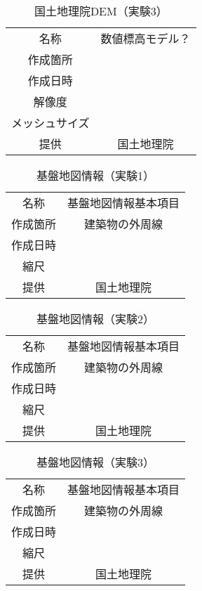     \begin{table}[b]
      \centering
      \caption{国土地理院DEM（実験3）}
      \label{国土地理院DEM3}
      \begin{tabular}{cc}
        \hline
        名称 & 数値標高モデル？ \\
        作成箇所 &  \\
        作成日時 &  \\
        解像度 & \\
        メッシュサイズ &  \\
        提供 & 国土地理院 \\ \hline
      \end{tabular}
    \end{table}

    \begin{table}[b]
      \centering
      \caption{基盤地図情報（実験1）}
      \label{基盤地図情報1}
      \begin{tabular}{cc}
        \hline
        名称 & 基盤地図情報基本項目 \\
        作成箇所 & 建築物の外周線 \\
        作成日時 &  \\
        縮尺 & \\
        提供 & 国土地理院 \\ \hline
      \end{tabular}
    \end{table}


    \begin{table}[b]
      \centering
      \caption{基盤地図情報（実験2）}
      \label{基盤地図情報2}
      \begin{tabular}{cc}
        \hline
        名称 & 基盤地図情報基本項目 \\
        作成箇所 & 建築物の外周線 \\
        作成日時 &  \\
        縮尺 & \\
        提供 & 国土地理院 \\ \hline
      \end{tabular}
    \end{table}

    \begin{table}[b]
      \centering
      \caption{基盤地図情報（実験3）}
      \label{基盤地図情報3}
      \begin{tabular}{cc}
        \hline
        名称 & 基盤地図情報基本項目 \\
        作成箇所 & 建築物の外周線 \\
        作成日時 &  \\
        縮尺 & \\
        提供 & 国土地理院 \\ \hline
      \end{tabular}
    \end{table}


